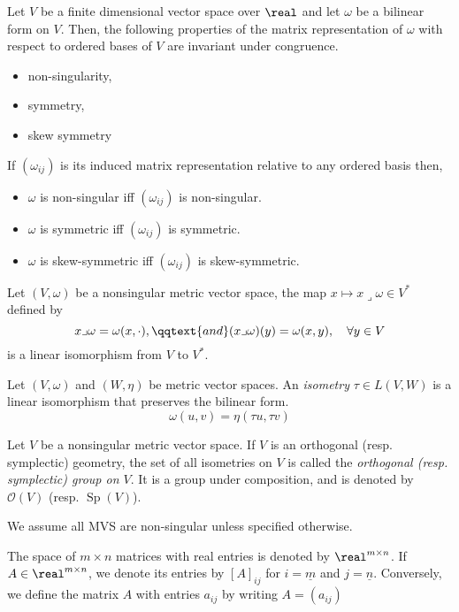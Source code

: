 \documentclass[../main-v2-manifolds.tex]{subfiles}
\begin{document}
    \begin{lemma}\label{lem:characterisation of bilinear forms}
        Let $V$ be a finite dimensional vector space over $\real$ and let $\omega$ be a bilinear form on $V$. Then, the following properties of the matrix representation of $\omega$ with respect to ordered bases of $V$ are invariant under congruence.
        \begin{itemize}
            \item non-singularity,
            \item symmetry,
            \item skew symmetry
        \end{itemize}
        If $(\omega_{ij})$ is its induced matrix representation relative to any ordered basis then,
        \begin{itemize}
            \item $\omega$ is non-singular iff $(\omega_{ij})$ is non-singular.
           \item $\omega$ is symmetric iff $(\omega_{ij})$ is symmetric.
           \item $\omega$ is skew-symmetric iff $(\omega_{ij})$ is skew-symmetric.
        \end{itemize}
   \end{lemma}     
    
    \begin{wts}\label{eq:Riesz Representation MVS}
        Let $(V,\omega)$ be a nonsingular metric vector space, the map $x\mapsto x\lrcorner \omega\in V^*$ defined by
        \[
            x\lrcorner\omega = \omega(x,\cdot),\qqtext{and}(x\lrcorner\omega)(y) = \omega(x,y),\quad\forall y\in V
        \]
        is a linear isomorphism from $V$ to $V^*$. 
    \end{wts}

    Let $(V,\omega)$ and $(W, \eta)$ be metric vector spaces. An \emph{isometry} $\tau\in L(V,W)$ is a linear isomorphism that preserves the bilinear form.
    \[
        \omega(u,v) = \eta(\tau u, \tau v)
    \]
    \begin{definition}
        Let $V$ be a nonsingular metric vector space. If $V$ is an orthogonal (resp. symplectic) geometry, the set of all isometries on $V$ is called the \emph{orthogonal (resp. symplectic) group on $V$}. It is a group under composition, and is denoted by $\mathcal{O}(V)$ (resp. $\operatorname{Sp}(V)$).
    \end{definition}
    \begin{remark}
        We assume all MVS are non-singular unless specified otherwise.
    \end{remark}
The space of $m\times n$ matrices with real entries is denoted by $\real^{m\times n}$. If $A\in\real^{m\times n}$, we denote its entries by $[A]_{ij}$ for $i=\underline{m}$ and $j = \underline{n}$. Conversely, we define the matrix $A$ with entries $a_{ij}$ by writing $A = (a_{ij})$\\
\end{document}
